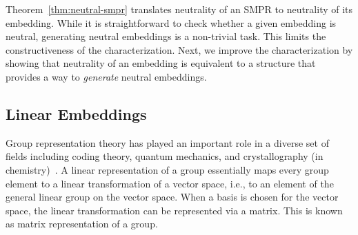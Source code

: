 \documentclass[prodmode]{acmsmall-ec14}
\begin{document}

\noindent
Theorem~\ref{thm:neutral-smpr} translates neutrality of an SMPR to neutrality of its embedding. While it is straightforward to check whether a given embedding is neutral, generating neutral embeddings is a non-trivial task. This limits the constructiveness of the characterization. Next, we improve the characterization by showing that neutrality of an embedding is equivalent to a structure that provides a way to \emph{generate} neutral embeddings. 

\subsection{Linear Embeddings}
\label{sec:linear}

Group representation theory has played an important role in a diverse set of fields including %
coding theory, quantum mechanics, and crystallography (in chemistry)~\cite{BR86,KHS93,MS77}. A linear representation of a group essentially maps every group element to a linear transformation of a vector space, i.e., to an element of the general linear group on the vector space. When a basis is chosen for the vector space, the linear transformation can be represented via a matrix. This is known as matrix representation of a group. 
\end{document}
